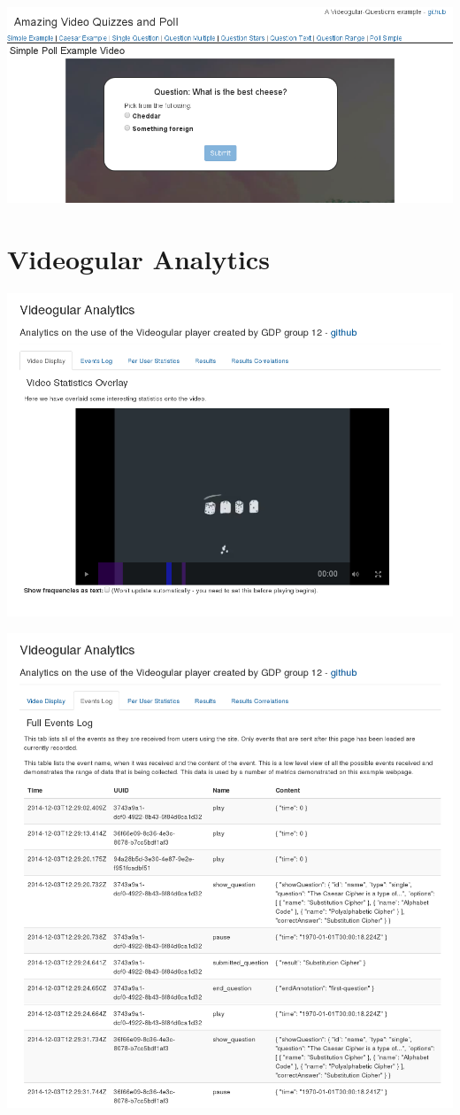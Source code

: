 \includegraphics[width=\textwidth]{screenshots/videogular-questions-example-poll-simple.png}

\section{Videogular Analytics}

\includegraphics[width=\textwidth]{screenshots/videogular-analytics-video.png}

\includegraphics[width=\textwidth]{screenshots/videogular-analytics-events.png}

